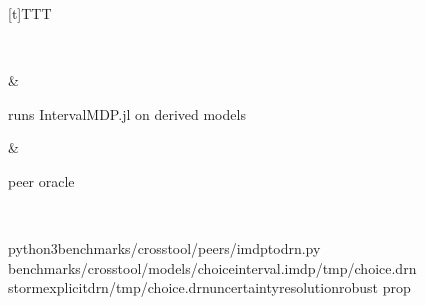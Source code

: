 \documentclass[a4paper,10pt,english]{sphinxmanual}
\begin{document}
\begin{savenotes}
\begin{tabulary}{\linewidth}[t]{TTT}
\begin{varwidth}[t]{}
\end{varwidth}%
\\
\sphinxhline\begin{varwidth}[t]{}
\sphinxAtStartPar
{}
\sphinxbeforeendvarwidth
\end{varwidth}%
&\begin{varwidth}[t]{}
\sphinxAtStartPar
runs IntervalMDP.jl on \sphinxhyphen{}derived models
\sphinxbeforeendvarwidth
\end{varwidth}%
&\begin{varwidth}[t]{}
\sphinxAtStartPar
peer oracle
\sphinxbeforeendvarwidth
\end{varwidth}%
\\
\sphinxbottomrule
\end{tabulary}
\sphinxtableafterendhook\par
\sphinxattableend\end{savenotes}

\begin{sphinxVerbatim}[commandchars=\\\{\}]
python3benchmarks/crosstool/peers/imdp\PYGZus{}to\PYGZus{}drn.py
benchmarks/crosstool/models/choice\PYGZus{}interval.imdp/tmp/choice.drn
storm\PYGZhy{}\PYGZhy{}explicit\PYGZhy{}drn/tmp/choice.drn\PYGZhy{}\PYGZhy{}uncertainty\PYGZhy{}resolutionrobust
\PYGZhy{}\PYGZhy{}prop
\end{sphinxVerbatim}
\end{document}
